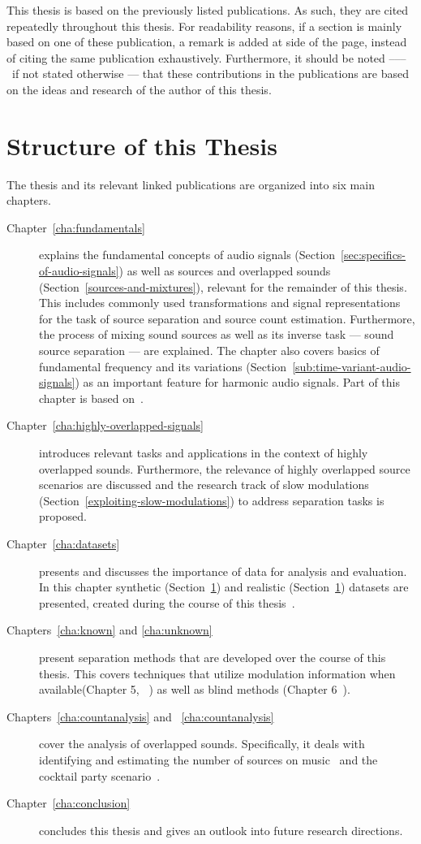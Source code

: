 This thesis is based on the previously listed publications. As such, they are cited repeatedly throughout this thesis. For readability reasons, if a section is mainly based on one of these publication, a remark is added at side of the page, instead of citing the same publication exhaustively. Furthermore, it should be noted ––– if not stated otherwise ---  that these contributions in the publications are based on the ideas and research of the author of this thesis.

\section{Structure of this Thesis}

The thesis and its relevant linked publications are organized into six main chapters.
\begin{description}
  \item[Chapter~\ref{cha:fundamentals}] explains the fundamental concepts of audio signals (Section~\ref{sec:specifics-of-audio-signals}) as well as sources and overlapped sounds (Section~\ref{sources-and-mixtures}), relevant for the remainder of this thesis.
  This includes commonly used transformations and signal representations for the task of source separation and source count estimation.
  Furthermore, the process of mixing sound sources as well as its inverse task --- sound source separation --- are explained.
  The chapter also covers basics of fundamental frequency and its variations (Section~\ref{sub:time-variant-audio-signals}) as an important feature for harmonic audio signals.
  Part of this chapter is based on~\cite{rafii18}.
  \item[Chapter~\ref{cha:highly-overlapped-signals}] introduces relevant tasks and applications in the context of highly overlapped sounds.
  Furthermore, the relevance of highly overlapped source scenarios are discussed and the research track of slow  modulations (Section~\ref{exploiting-slow-modulations}) to address separation tasks is proposed.
  \item[Chapter~\ref{cha:datasets}] presents and discusses the importance of data for analysis and evaluation.
  In this chapter synthetic (Section~\ref{}) and realistic (Section~\ref{}) datasets are presented, created during the course of this thesis~\cite{oss_wice, oss_unison, oss_libricount, stoeter15acm, liutkus17}.
  \item[Chapters~\ref{cha:known} and \ref{cha:unknown}] present separation methods that are developed over the course of this thesis.
  This covers techniques that utilize modulation information when available(Chapter 5, ~\cite{stoeter14, stoeter15icassp}) as well as blind methods (Chapter 6~\cite{stoeter16, liutkus17}).
  \item[Chapters~\ref{cha:countanalysis} and ~\ref{cha:countanalysis}] cover the analysis of overlapped sounds. Specifically, it deals with identifying and estimating the number of sources on music~\cite{schoeffler13, stoeter13} and the cocktail party scenario~\cite{stoeter19, stoeter18}.
  \item[Chapter~\ref{cha:conclusion}] concludes this thesis and gives an outlook into future research directions.
\end{description}
